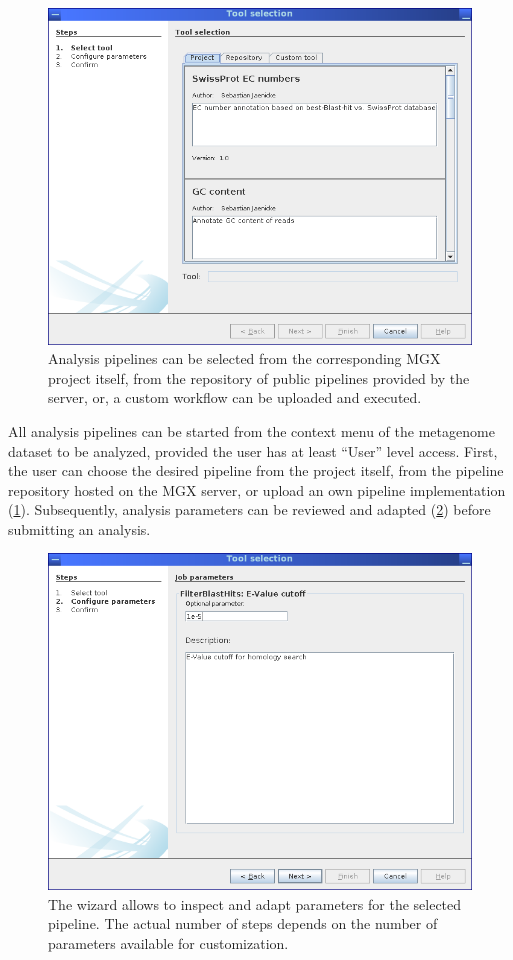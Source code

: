 \begin{figure}[H]
\centering
\includegraphics[width=.8\textwidth]{img/mgx/analysiswiz1}
\caption[Analysis selection]{Analysis pipelines can be selected from the corresponding
MGX project itself, from the repository of public pipelines provided by the server, or,
a custom workflow can be uploaded and executed.}
\label{anawiz1}
\end{figure}

All analysis pipelines can be started from the context menu of the metagenome dataset to be analyzed, provided
the user has at least ``User'' level access. First,
the user can choose the desired pipeline from the project itself, from the pipeline repository hosted on the
MGX server, or upload an own pipeline implementation (\ref{anawiz1}). Subsequently, analysis parameters
can be reviewed and adapted (\ref{anawiz2}) before submitting an analysis.

\begin{figure}[H]
\centering
\includegraphics[width=.8\textwidth]{img/mgx/analysiswiz2}
\caption[Analysis parameters]{The wizard allows to inspect and adapt parameters for the selected pipeline. The actual
number of steps depends on the number of parameters available for customization.}
\label{anawiz2}
\end{figure}

